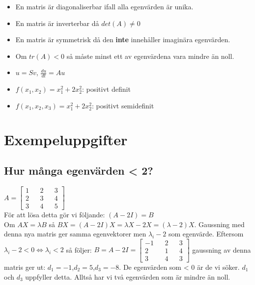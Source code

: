 \documentclass[a4paper]{article}
\begin{document}
\begin{itemize}
\item En matris är diagonaliserbar ifall alla egenvärden är unika.
\item En matris är inverterbar då $det(A)\ne0$
\item En matris är symmetrisk då den \textbf{inte} innehåller imaginära egenvärden.
\item Om $tr(A)<0$ så måste minst ett av egenvärdena vara mindre än noll.
\item $u=Sv$, $\frac{du}{dt}=Au$
\item $f(x_1,x_2)=x_1^2+2x_2^2$: positivt definit
\item $f(x_1,x_2,x_3)=x_1^2+2x_2^2$: positivt semidefinit
\end{itemize}
\section{Exempeluppgifter}
\subsection{Hur många egenvärden < 2?}
$A=\begin{bmatrix}1&&2&&3\\2&&3&&4\\3&&4&&5\end{bmatrix}$\\
För att lösa detta gör vi följande: $(A-2I)=B$\\ Om $AX=\lambda B$ så $BX=(A-2I)X=\lambda X-2X=(\lambda-2)X$. Gaussning med denna nya matris ger samma egenvektorer men $\lambda_i-2$ som egenvärde. Eftersom $\lambda_i-2<0 \Leftrightarrow \lambda_i<2$ så följer:
$B=A-2I=\begin{bmatrix}-1&&2&&3\\2&&1&&4\\3&&4&&3\end{bmatrix}$ gaussning av denna matris ger ut: $d_1=-1$,$d_2=5$,$d_3=-8$. De egenvärden som < 0 är de vi söker. $d_1$ och $d_3$ uppfyller detta. Alltså har vi två egenvärden som är mindre än noll.
\end{document}
